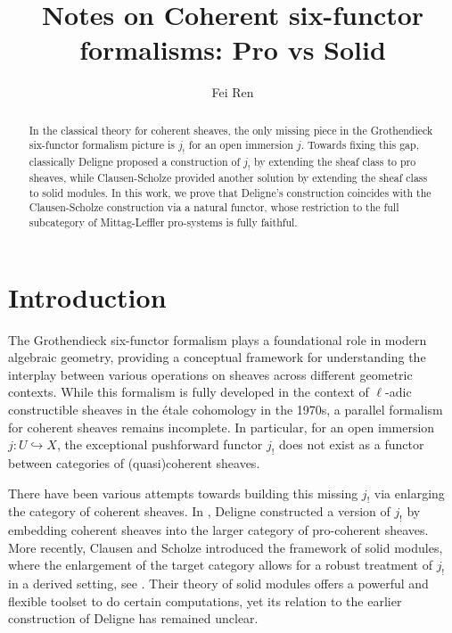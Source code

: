 \documentclass[11pt]{amsart}
\title{Notes on Coherent six-functor formalisms: Pro vs Solid}
\author{Fei Ren}
\newcommand{\hra}{\hookrightarrow}
\theoremstyle{plain}
\theoremstyle{definition}
\numberwithin{equation}{prop}
\begin{document}
\sloppy

\begin{abstract}
In the classical theory for coherent sheaves, the only missing piece in the Grothendieck six-functor formalism picture is $j_!$ for an open immersion $j$.
Towards fixing this gap,
classically Deligne proposed a construction of $j_!$ by extending the sheaf class to pro sheaves, while Clausen-Scholze provided another solution by extending the sheaf class to solid modules.
In this work, we prove that Deligne's construction coincides with the Clausen-Scholze construction via a natural functor, whose restriction to the full subcategory of Mittag-Leffler pro-systems is fully faithful.
\end{abstract}
\maketitle

\tableofcontents

\section{Introduction}


The Grothendieck six-functor formalism plays a foundational role in modern algebraic geometry, providing a conceptual framework for understanding the interplay between various operations on sheaves across different geometric contexts. 
While this formalism is fully developed in the context of $\ell$-adic constructible sheaves in the étale cohomology in the 1970s, a parallel formalism for coherent sheaves remains incomplete. 
In particular, for an open immersion 
$j: U\hra X$, the exceptional pushforward functor $j_!$
does not exist as a functor between categories of (quasi)coherent sheaves. 


There have been various attempts towards building this missing $j_!$ via enlarging the category of coherent sheaves.  
In \cite[Appendix]{Hartshorne_RD}, Deligne constructed a version of $j_!$
by embedding coherent sheaves into the larger category of pro-coherent sheaves. 
More recently, Clausen and Scholze introduced the framework of solid modules, where the enlargement of  the target category allows for a robust treatment of $j_!$ in a derived setting, see \cite[Lecture VIII]{CS}. 
Their theory of solid modules offers a powerful and flexible toolset to do certain computations, yet its relation to the earlier construction of Deligne has remained unclear.
\end{document}
